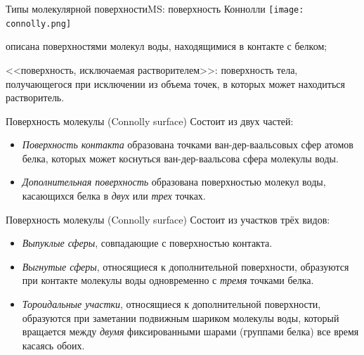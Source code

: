 \documentclass{beamer}
\begin{document}
    \begin{frame}{Типы молекулярной поверхности}{MS: поверхность Коннолли}
        \texttt{[image: connolly.png]}

        описана поверхностями молекул воды, находящимися в контакте с белком;

        <<поверхность, исключаемая растворителем>>:
        поверхность тела, получающегося при исключении из объема точек,
        в которых может находиться растворитель.

    \end{frame}

    \begin{frame}{Поверхность молекулы (Connolly surface)}
        Состоит из двух частей:
        \begin{itemize}
        \item \emph{Поверхность контакта} образована точками ван-дер-ваальсовых
            сфер атомов белка, которых может коснуться ван-дер-ваальсова сфера
            молекулы воды.
        \item \emph{Дополнительная поверхность} образована поверхностью
            молекул воды, касающихся белка в \emph{двух} или \emph{трех} точках.
        \end{itemize}
    \end{frame}

    \begin{frame}{Поверхность молекулы (Connolly surface)}
        Состоит из участков трёх видов:
        \begin{itemize}
        \item \emph{Выпуклые сферы}, совпадающие с поверхностью контакта.
        \item \emph{Выгнутые сферы}, относящиеся к дополнительной поверхности,
            образуются при контакте молекулы воды одновременно с \emph{тремя}
            точками белка.
        \item \emph{Тороидальные участки},
            относящиеся к дополнительной поверхности,
            образуются при заметании подвижным шариком молекулы воды,
            который вращается между \emph{двумя} фиксированными шарами
            (группами белка) все время касаясь обоих.
        \end{itemize}
    \end{frame}
\end{document}
